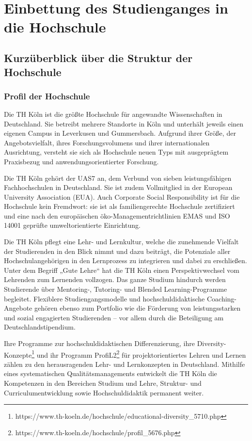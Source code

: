 \chapter{Einbettung des Studienganges in die
Hochschule}\label{einbettung-des-studienganges-in-die-hochschule}

\section{Kurzüberblick über die Struktur der
Hochschule}\label{kurzuxfcberblick-uxfcber-die-struktur-der-hochschule}

\subsection{Profil der Hochschule}\label{profil-der-hochschule}

Die TH Köln ist die größte Hochschule für angewandte Wissenschaften in
Deutschland. Sie betreibt mehrere Standorte in Köln und unterhält
jeweils einen eigenen Campus in Leverkusen und Gummersbach. Aufgrund
ihrer Größe, der Angebotsvielfalt, ihres Forschungsvolumens und ihrer
internationalen Ausrichtung, versteht sie sich als Hochschule neuen Typs
mit ausgeprägtem Praxisbezug und anwendungsorientierter Forschung.

Die TH Köln gehört der UAS7 an, dem Verbund von sieben leistungsfähigen
Fachhochschulen in Deutschland. Sie ist zudem Vollmitglied in der
European University Association (EUA). Auch Corporate Social
Responsibility ist für die Hochschule kein Fremdwort: sie ist als
familiengerechte Hochschule zertifiziert und eine nach den europäischen
öko-Managementrichtlinien EMAS und ISO 14001 geprüfte umweltorientierte
Einrichtung.

Die TH Köln pflegt eine Lehr- und Lernkultur, welche die zunehmende
Vielfalt der Studierenden in den Blick nimmt und dazu beiträgt, die
Potenziale aller Hochschulangehörigen in den Lernprozess zu integrieren
und dabei zu erschließen. Unter dem Begriff „Gute Lehre`` hat die TH
Köln einen Perspektivwechsel vom Lehrenden zum Lernenden vollzogen. Das
ganze Studium hindurch werden Studierende über Mentoring-, Tutoring- und
Blended Learning-Programme begleitet. Flexiblere Studiengangsmodelle und
hochschuldidaktische Coaching-Angebote gehören ebenso zum Portfolio wie
die Förderung von leistungsstarken und sozial engagierten Studierenden
-- vor allem durch die Beteiligung am Deutschlandstipendium.

Ihre Programme zur hochschuldidaktischen Differenzierung, ihre
Diversity-Konzepte\footnote{https://www.th-koeln.de/hochschule/educational-diversity\_5710.php}
und ihr Programm ProfiL2\footnote{https://www.th-koeln.de/hochschule/profil\_5676.php}
für projektorientiertes Lehren und Lernen zählen zu den herausragenden
Lehr- und Lernkonzepten in Deutschland. Mithilfe eines systematischen
Qualitätsmanagements entwickelt die TH Köln die Kompetenzen in den
Bereichen Studium und Lehre, Struktur- und Curriculumentwicklung sowie
Hochschuldidaktik permanent weiter.

